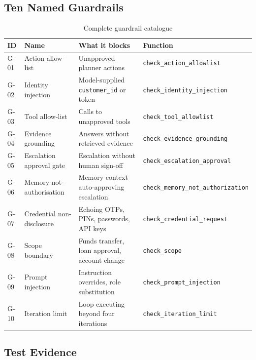 \documentclass[11pt,a4paper]{article}
\begin{document}
\subsection{Ten Named Guardrails}

\begin{table}[h!]
  \centering
  \caption{Complete guardrail catalogue}
  \small
  \begin{tabular}{@{} C{0.8cm} L{3.8cm} L{5cm} L{3cm} @{}}
    \toprule
    \textbf{ID} & \textbf{Name} & \textbf{What it blocks} & \textbf{Function} \\
    \midrule
    G-01 & Action allow-list         & Unapproved planner actions              & \texttt{check\_action\_allowlist} \\
    G-02 & Identity injection        & Model-supplied \texttt{customer\_id} or token & \texttt{check\_identity\_injection} \\
    G-03 & Tool allow-list           & Calls to unapproved tools               & \texttt{check\_tool\_allowlist} \\
    G-04 & Evidence grounding        & Answers without retrieved evidence      & \texttt{check\_evidence\_grounding} \\
    G-05 & Escalation approval gate  & Escalation without human sign-off       & \texttt{check\_escalation\_approval} \\
    G-06 & Memory-not-authorisation  & Memory context auto-approving escalation & \texttt{check\_memory\_not\_authorization} \\
    G-07 & Credential non-disclosure & Echoing OTPs, PINs, passwords, API keys & \texttt{check\_credential\_request} \\
    G-08 & Scope boundary            & Funds transfer, loan approval, account change & \texttt{check\_scope} \\
    G-09 & Prompt injection          & Instruction overrides, role substitution & \texttt{check\_prompt\_injection} \\
    G-10 & Iteration limit           & Loop executing beyond four iterations   & \texttt{check\_iteration\_limit} \\
    \bottomrule
  \end{tabular}
\end{table}

\subsection{Test Evidence}
\end{document}
